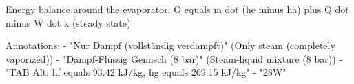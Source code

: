 Energy balance around the evaporator:
O equals m dot (he minus ha) plus Q dot minus W dot k (steady state)

Annotations:
- "Nur Dampf (vollständig verdampft)" (Only steam (completely vaporized))
- "Dampf-Flüssig Gemisch (8 bar)" (Steam-liquid mixture (8 bar))
- "TAB Alt: hf equals 93.42 kJ/kg, hg equals 269.15 kJ/kg"
- "28W"